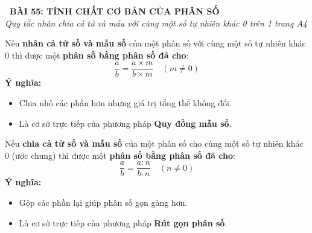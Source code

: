 \documentclass[14pt,a4paper,oneside]{extbook}
\begin{document}
\noindent
\begin{tcolorbox}[
  enhanced,
  colback=teal!8!white,
  colframe=teal!80!black,
  arc=3mm, boxrule=1pt,
  left=3mm, right=3mm, top=2mm, bottom=2mm,
  halign=center
]
  {\Large\bfseries\color{teal!90!black}\faBookmark\ BÀI 55: TÍNH CHẤT CƠ BẢN CỦA PHÂN SỐ}\\[1.5pt]
  {\footnotesize\itshape\color{black!75} Quy tắc nhân chia cả tử và mẫu với cùng một số tự nhiên khác 0 trên 1 trang A4}
\end{tcolorbox}

\vspace{-2.5mm}

\noindent
\begin{minipage}[t]{0.49\textwidth}\vspace{0pt}
\begin{tcolorbox}[
  enhanced,
  colback=blue!4!white,
  colframe=blue!75!black,
  arc=2mm, boxrule=0.8pt,
  left=2mm, right=2mm, top=1.8mm, bottom=1.8mm,
  title={\footnotesize\bfseries\color{white}\faTimesCircle\ 1. Quy tắc Nhân (Nhân lên)}
]
{\footnotesize
Nếu \textbf{nhân cả tử số và mẫu số} của một phân số với cùng một số tự nhiên khác 0 thì được một \textbf{phân số bằng phân số đã cho}:
$$\dfrac{a}{b} = \dfrac{a \times m}{b \times m} \quad (m \ne 0)$$
\textbf{Ý nghĩa:}
\begin{itemize}\setlength{\itemsep}{1pt}\setlength{\leftskip}{-2.5mm}
  \item Chia nhỏ các phần hơn nhưng giá trị tổng thể không đổi.
  \item Là cơ sở trực tiếp của phương pháp \textbf{Quy đồng mẫu số}.
\end{itemize}
}
\end{tcolorbox}
\end{minipage}
\hfill
\begin{minipage}[t]{0.49\textwidth}\vspace{0pt}
\begin{tcolorbox}[
  enhanced,
  colback=teal!4!white,
  colframe=teal!75!black,
  arc=2mm, boxrule=0.8pt,
  left=2mm, right=2mm, top=1.8mm, bottom=1.8mm,
  title={\footnotesize\bfseries\color{white}\faMinusCircle\ 2. Quy tắc Chia (Chia bớt)}
]
{\footnotesize
Nếu \textbf{chia cả tử số và mẫu số} của một phân số cho cùng một số tự nhiên khác 0 (ước chung) thì được một \textbf{phân số bằng phân số đã cho}:
$$\dfrac{a}{b} = \dfrac{a : n}{b : n} \quad (n \ne 0)$$
\textbf{Ý nghĩa:}
\begin{itemize}\setlength{\itemsep}{1pt}\setlength{\leftskip}{-2.5mm}
  \item Gộp các phần lại giúp phân số gọn gàng hơn.
  \item Là cơ sở trực tiếp của phương pháp \textbf{Rút gọn phân số}.
\end{itemize}
}
\end{tcolorbox}
\end{minipage}
\end{document}
